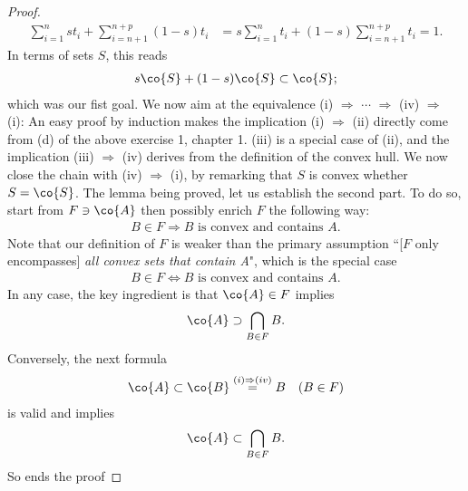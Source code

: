 \begin{proof}
\begin{align}
  \sum_{i=1}^n st_i + \sum_{i=n+1}^{n+p} (1-s)t_i &= 
  s\sum_{i=1}^n t_i +(1-s) \sum_{i=n+1}^{n+p} t_i  = 1.
\end{align}
%
In terms of sets $S$, this reads %
\begin{align}
  s\co{S} + (1-s)\co{S} \subset \co{S}; 
\end{align}
which was our fist goal. %
We now aim at the equivalence %
%
(i) $\Rightarrow$ $\cdots$ $\Rightarrow$ (iv) $\Rightarrow$ (i): %
%
An easy proof by induction makes the implication (i) $\Rightarrow$ (ii) %
directly come from (d) of the above exercise 1, chapter 1. %
%
(iii) is a special case of (ii),
and the implication (iii) $\Rightarrow$ (iv) derives from the definition of %
the convex hull. %
%
We now close the chain with (iv) $\Rightarrow$ (i), %
by remarking that $S$ is convex whether $S = \co{S}$. %
%  
The lemma being proved, let us establish the second part. %
To do so, start from $F\ni\co{A}$ then possibly enrich $F$ the following way: %
\begin{align}
  B \in F \Rightarrow B \text{ is convex and contains }A.
\end{align}
Note that our definition of $F$ is weaker than the primary assumption %
``[$F$ only encompasses] \textit{all convex sets that contain A}", %
which is the special case %
%
\begin{align}
  B \in F \Leftrightarrow B \text{ is convex and contains }A.
\end{align}
%
In any case, the key ingredient is that $\co{A} \in F$ implies %
%
\begin{align}
 \co{A} \supset \bigcap_{B \in F} B.
\end{align}
%
Conversely, the next formula %
%
\begin{align}
  \co{A} \subset \co{B} \overset{(i) \Rightarrow (iv)}{=} B \quad (B \in F) 
\end{align}
%
is valid and implies %
\begin{align}
  \co{A} \subset \bigcap_{B \in F} B. 
\end{align}
%
So ends the proof
\end{proof}
%